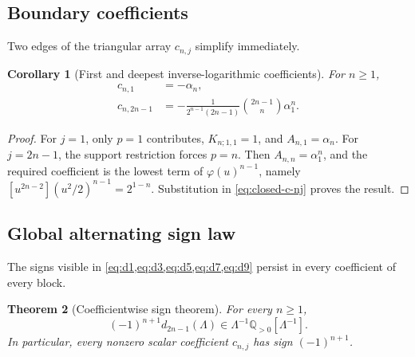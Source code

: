 \documentclass[11pt,a4paper,oneside]{article}
\theoremstyle{plain}
\newtheorem{theorem}{Theorem}[section]
\newtheorem{corollary}[theorem]{Corollary}
\theoremstyle{definition}
\theoremstyle{remark}
\newcommand{\Q}{\mathbb Q}
\begin{document}
\subsection{Boundary coefficients}

Two edges of the triangular array $c_{n,j}$ simplify immediately.

\begin{corollary}[First and deepest inverse-logarithmic coefficients]
\label{cor:boundary-coefficients}
For $n\ge1$,
\begin{align}
 c_{n,1}&=-\alpha_n,
 \label{eq:c-n1}\\
 c_{n,2n-1}&=-\frac1{2^{n-1}(2n-1)}
 \binom{2n-1}{n}\alpha_1^n.
 \label{eq:c-deepest}
\end{align}
\end{corollary}

\begin{proof}
For $j=1$, only $p=1$ contributes, $K_{n;1,1}=1$, and
$A_{n,1}=\alpha_n$.  For $j=2n-1$, the support restriction forces $p=n$.
Then $A_{n,n}=\alpha_1^n$, and the required coefficient is the lowest term of
$\varphi(u)^{n-1}$, namely
$[u^{2n-2}](u^2/2)^{n-1}=2^{1-n}$.  Substitution in
\cref{eq:closed-c-nj} proves the result.
\end{proof}

\subsection{Global alternating sign law}

The signs visible in \cref{eq:d1,eq:d3,eq:d5,eq:d7,eq:d9} persist in every
coefficient of every block.

\begin{theorem}[Coefficientwise sign theorem]
\label{thm:sign-law}
For every $n\ge1$,
\begin{equation}
 (-1)^{n+1}d_{2n-1}(\Lambda)
 \in\Lambda^{-1}\Q_{>0}[\Lambda^{-1}].
 \label{eq:sign-law}
\end{equation}
In particular, every nonzero scalar coefficient $c_{n,j}$ has sign
$(-1)^{n+1}$.
\end{theorem}
\end{document}
